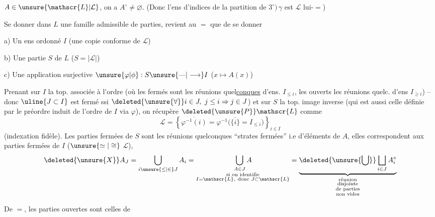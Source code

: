   $A\in\unsure{\mathscr{L}|\mathcal{L}}$, on a $A^\circ\ne\varnothing$. (Donc l'ens d'indices de la partition de $3^\circ)\,\gamma$ est $\mathscr{L}$ lui-\ensuremath{=})



Se donner dans $L$ une famille admissible  de parties, revient au $=$ que de se donner

a) Un ens ordonné $I$ \qquad (une copie conforme de $\mathscr{L}$)

b) Une partie $S$ de $L$ \qquad ($S=|\mathscr{L}|$)

c) Une application surjective $\unsure{\varphi|\phi}:S\unsure{\text{---}|\longrightarrow}I$ \quad ($x\mapsto A(x)$)

Prenant sur $I$ la top. associée à l'ordre (où les fermés sont les réunions quel\uline{conques} d'ens. $I_{\leq i}$, les ouverts les réunions quelc. d'ens $I_{\geq i}$) -- donc $\uline{\ensuremath{J\subset I}}$ est fermé ssi $\deleted{\unsure{\forall}}i\in J,\ j\leq i\Rightarrow j\in J$) et sur $S$ la top. image inverse (qui est aussi celle définie par le préordre induit de l'ordre de $I$ via $\varphi$),  on récupère $\deleted{\unsure{P}}\mathscr{L}$ comme
\[
 \mathscr{L}=\left\{\overline{\varphi^{-1}(i)}=\varphi^{-1}
 \bigl(\overline{\{i\}}=I_{\leq i}\bigr)\right\}_{i\in I}
\]
(indexation fidèle). Les parties fermées de $S$ sont les réunions quelconques  ``strates fermées'' i.e d'éléments de $A$, elles correspondent  aux parties fermées  de $I$ ($\unsure{\simeq|\cong}$  $\mathscr{L}$),  
\[
\deleted{\unsure{X}}A_J=\bigcup_{i\unsure{\leq|\in}J}A_i
 =\underset{\substack{\text{si on identifie}\\I=\mathscr{L},\ \text{donc }J\subset\mathscr{L}}}{\bigcup_{A\in J} A}
 =\underbrace{\deleted{\unsure{\bigcup}}\bigsqcup_{i\in J}A_i^\circ}_{\substack{\text{réunion}\\\text{disjointe}\\\text{de parties}\\\text{non vides}}}
\]
 

De $=$, les parties ouvertes sont celles de
